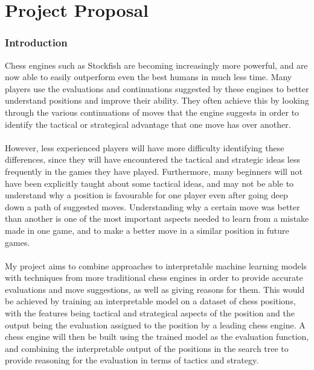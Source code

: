 \documentclass[12pt,a4paper]{article}
\begin{document}
\part*{Project Proposal}
\section*{Introduction}
Chess engines such as Stockfish are becoming increasingly more powerful, and are now able to easily outperform even the best humans in much less time. Many players use the evaluations and continuations suggested by these engines to better understand positions and improve their ability. They often achieve this by looking through the various continuations of moves that the engine suggests in order to identify the tactical or strategical advantage that one move has over another.
\\\\
However, less experienced players will have more difficulty identifying these differences, since they will have encountered the tactical and strategic ideas less frequently in the games they have played. Furthermore, many beginners will not have been explicitly taught about some tactical ideas, and may not be able to understand why a position is favourable for one player even after going deep down a path of suggested moves. Understanding why a certain move was better than another is one of the most important aspects needed to learn from a mistake made in one game, and to make a better move in a similar position in future games.
\\\\
My project aims to combine approaches to interpretable machine learning models with techniques from more traditional chess engines in order to provide accurate evaluations and move suggestions, as well as giving reasons for them. This would be achieved by training an interpretable model on a dataset of chess positions, with the features being tactical and strategical aspects of the position and the output being the evaluation assigned to the position by a leading chess engine. A chess engine will then be built using the trained model as the evaluation function, and combining the interpretable output of the positions in the search tree to provide reasoning for the evaluation in terms of tactics and strategy.
\end{document}
